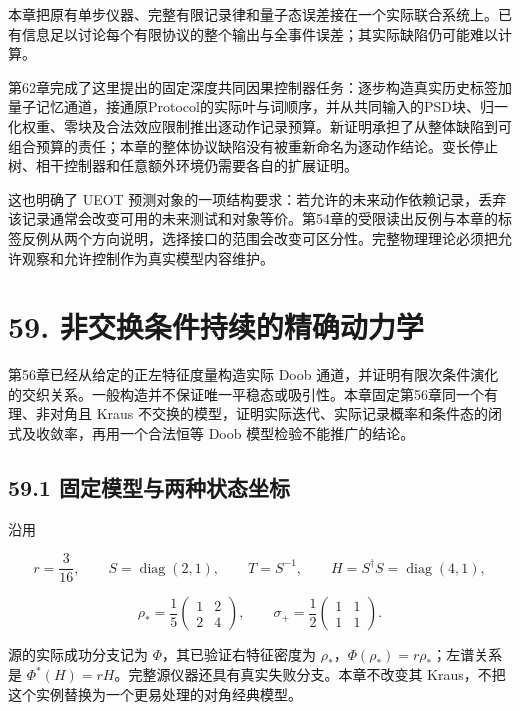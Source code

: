 \documentclass[
  11pt,
  oneside]{book}
\begin{document}
本章把原有单步仪器、完整有限记录律和量子态误差接在一个实际联合系统上。已有信息足以讨论每个有限协议的整个输出与全事件误差；其实际缺陷仍可能难以计算。

第62章完成了这里提出的固定深度共同因果控制器任务：逐步构造真实历史标签加量子记忆通道，接通原Protocol的实际叶与词顺序，并从共同输入的PSD块、归一化权重、零块及合法效应限制推出逐动作记录预算。新证明承担了从整体缺陷到可组合预算的责任；本章的整体协议缺陷没有被重新命名为逐动作结论。变长停止树、相干控制器和任意额外环境仍需要各自的扩展证明。

这也明确了 UEOT
预测对象的一项结构要求：若允许的未来动作依赖记录，丢弃该记录通常会改变可用的未来测试和对象等价。第54章的受限读出反例与本章的标签反例从两个方向说明，选择接口的范围会改变可区分性。完整物理理论必须把允许观察和允许控制作为真实模型内容维护。

\hypertarget{ch-59}{%
\chapter{59. 非交换条件持续的精确动力学}\label{ch-59}}

第56章已经从给定的正左特征度量构造实际 Doob
通道，并证明有限次条件演化的交织关系。一般构造并不保证唯一平稳态或吸引性。本章固定第56章同一个有理、非对角且
Kraus
不交换的模型，证明实际迭代、实际记录概率和条件态的闭式及收敛率，再用一个合法恒等
Doob 模型检验不能推广的结论。

\hypertarget{ux56faux5b9aux6a21ux578bux4e0eux4e24ux79cdux72b6ux6001ux5750ux6807}{%
\section{59.1
固定模型与两种状态坐标}\label{ux56faux5b9aux6a21ux578bux4e0eux4e24ux79cdux72b6ux6001ux5750ux6807}}

沿用

\[
r=\frac3{16},\qquad S=\operatorname{diag}(2,1),\qquad T=S^{-1},\qquad
H=S^\dagger S=\operatorname{diag}(4,1),
\]

\[
\rho_* =\frac15\begin{pmatrix}1&2\\2&4\end{pmatrix},\qquad
\sigma_+=\frac12\begin{pmatrix}1&1\\1&1\end{pmatrix}.
\]

源的实际成功分支记为 \(\Phi\)，其已验证右特征密度为
\(\rho_*\)，\(\Phi(\rho_*)=r\rho_*\)；左谱关系是
\(\Phi^*(H)=rH\)。完整源仪器还具有真实失败分支。本章不改变其
Kraus，不把这个实例替换为一个更易处理的对角经典模型。
\end{document}

